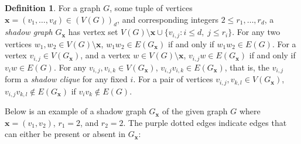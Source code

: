 \documentclass[12pt,reqno,dvipsnames]{amsart}
\theoremstyle{definition}
\newtheorem{defin}[theorem]{Definition}
\begin{document}
\begin{defin}
    For a graph $G$, some tuple of vertices $\mathbf{x}=(v_1,\dots,v_d)\in (V(G))_d$, and corresponding integers $2\le r_1,\dots,r_d$, a \emph{shadow graph} $G_\mathbf{x}$ has vertex set $V(G)\setminus \mathbf{x} \cup \{v_{i,j}:i \le d, \; j\le r_i\}$. For any two vertices $w_1,w_2\in V(G)\setminus \mathbf{x}$, $w_1w_2\in E(G_\mathbf{x})$ if and only if $w_1w_2\in E(G)$. For a vertex $v_{i,j}\in V(G_\mathbf{x})$, and a vertex $w\in V(G)\setminus \mathbf{x}$, $v_{i,j}w\in E(G_\mathbf{x})$ if and only if $v_iw\in E(G)$. For any $v_{i,j},v_{i,k}\in V(G_\mathbf{x})$, $v_{i,j}v_{i,k}\in E(G_\mathbf{x})$, that is, the $v_{i,j}$ form a \emph{shadow clique} for any fixed $i$. For a pair of vertices $v_{i,j},v_{k,l}\in V(G_\mathbf{x})$, $v_{i,j}v_{k,l}\notin E(G_\mathbf{x})$ if $v_iv_k \notin E(G)$.
\end{defin}
Below is an example of a shadow graph $G_\mathbf{x}$ of the given graph $G$ where $\mathbf{x}=(v_1,v_2)$, $r_1=2$, and $r_2=2$. The purple dotted edges indicate edges that can either be present or absent in $G_\mathbf{x}$:
\end{document}
